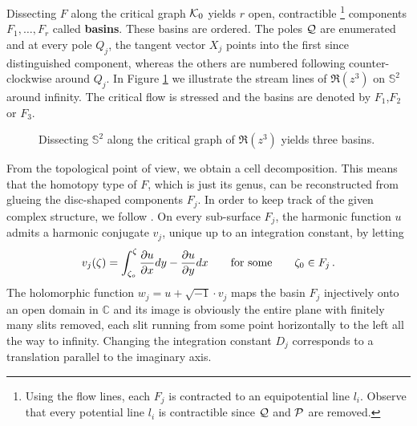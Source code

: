 \label{page:basin_parallel}%
Dissecting $F$ along the critical graph $\mc K_0$ yields $r$ open, contractible%
\footnote{%
    Using the flow lines, each $F_j$ is contracted to an equipotential line $l_i$.
    Observe that every potential line $l_i$ is contractible since $\mc Q$ and $\mc P$ are removed.
} components $F_1, \ldots, F_r$ called {\bf basins}.
These basins are ordered.
The poles $\mc Q$ are enumerated and at every pole $Q_j$, the tangent vector $X_j$ points into the first since distinguished component,
whereas the others are numbered following counter-clockwise around $Q_j$.
In Figure \ref{cellular_models:from_moduli_spaces_to_parallel_slit_domains:flow_with_three_basins} we illustrate the stream lines of $\Re(z^3)$ on $\mathbb S^2$ around infinity.
The critical flow is stressed and the basins are denoted by $F_1$,$F_2$ or $F_3$.
\begin{figure}[ht]
    \centering
    \def\svgwidth{.4\columnwidth}
    
    \caption{\label{cellular_models:from_moduli_spaces_to_parallel_slit_domains:flow_with_three_basins}Dissecting $\mathbb S^2$ along the critical graph of $\Re(z^3)$ yields three basins.}
\end{figure}

From the topological point of view, we obtain a cell decomposition.
This means that the homotopy type of $F$, which is just its genus, can be reconstructed from glueing the disc-shaped components $F_j$.
In order to keep track of the given complex structure, we follow \cite{Boedigheimer19901}.
On every sub-surface $F_j$, the harmonic function $u$ admits a harmonic conjugate $v_j$, unique up to an integration constant, by letting
\[
    v_j(\zeta) = \int_{\zeta_o}^\zeta \frac{\del u}{\del x}dy - \frac{\del u}{\del y}dx \mspc{for some}{20} \zeta_0 \in F_j \,.
\]
The holomorphic function $w_j = u + \sqrt{-1}\cdot v_j$ maps the basin $F_j$ injectively onto an open domain in $\mathbb C$ and
its image is obviously the entire plane with finitely many slits removed,
each slit running from some point horizontally to the left all the way to infinity.
Changing the integration constant $D_j$ corresponds to a translation parallel to the imaginary axis.

